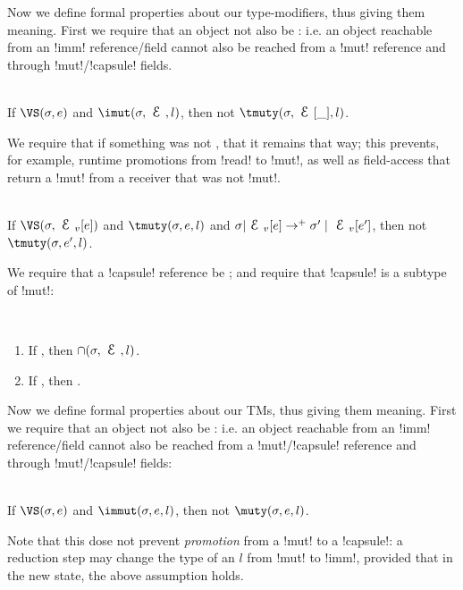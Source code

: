 Now we define formal properties about our type-modifiers, thus giving them meaning. First we require that an \imut object not also be \tmuty: i.e. an object reachable from an \Q!imm! reference/field cannot also be reached from a \Q!mut! reference and through \Q!mut!/\Q!capsule! fields.
\SS\begin{Assumption}\rm\ \\
\indent If $\VS(\s, e)$ and $\imut(\s, \E, l)$, then not $\tmuty(\s, \E[\_], l)$.
\end{Assumption}%

\noindent We require that if something was not \tmuty, that it remains that way; this prevents, for example, runtime promotions from \Q!read! to \Q!mut!, as well as field-access that return a \Q!mut! from a receiver that was not \Q!mut!.
\SS\begin{Assumption}\rm\ \\
\indent If $\VS(\s, \EV[e])$ and $\tmuty(\s, e, l)$ and $\s|\EV[e] \rightarrow^{+} \s'\mid\EV[e']$, then not $\tmuty(\s, e', l)$.
\end{Assumption}

\noindent We require that a \Q!capsule! reference be \cap; and require that \Q!capsule! is a subtype of \Q!mut!:
\SS\begin{Assumption}\rm\ 
\begin{enumerate}
\item If , then $\cap(\s, \E, l)$.
\item If , then .
\end{enumerate}
\end{Assumption}%

\noindent Now we define formal properties about our TMs, thus giving them meaning. First we require that an \immut object not also be \muty: i.e. an object reachable from an \Q!imm! reference/field cannot also be reached from a \Q!mut!/\Q!capsule! reference and through \Q!mut!/\Q!capsule! fields:%
\SS\begin{Assumption}[Imm Consistency]\rm\ \\
\indent If $\VS(\s, e)$ and $\immut(\s, e, l)$, then not $\muty(\s, e, l)$.

\noindent Note that this dose not prevent \emph{promotion} from a \Q!mut! to a \Q!capsule!: a reduction step may change the type of an $l$ from \Q!mut! to \Q!imm!, provided that in the new state, the above assumption holds.
\end{Assumption}

